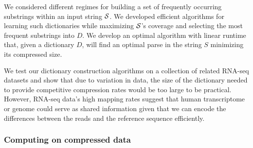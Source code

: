 \documentclass[12pt]{cmuthesis}
\begin{document}
  We considered different regimes for building a set of frequently occurring substrings within an input string $\mathcal{S}$. We developed efficient algorithms for learning such dictionaries while maximizing $\mathcal{S}$'s coverage and selecting the most frequent substrings into $D$. We develop an optimal algorithm with linear runtime that, given a dictionary $D$, will find an optimal parse in the string $S$ minimizing its compressed size.


  







	We test our dictionary construction algorithms on a collection of related RNA-seq datasets and show that due to variation in data, the size of the dictionary needed to provide competitive compression rates would be too large to be practical. However, RNA-seq data's high mapping rates suggest that human transcriptome or genome could serve as shared information given that we can encode the differences between the reads and the reference sequence efficiently.



  \subsubsection{Computing on compressed data}
\end{document}
